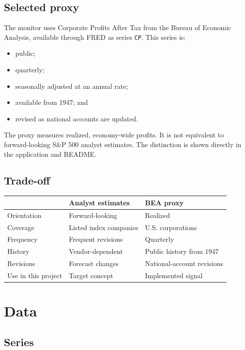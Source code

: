 \documentclass[11pt]{article}
\begin{document}
\subsection{Selected proxy}

The monitor uses Corporate Profits After Tax from the Bureau of Economic
Analysis, available through FRED as series \texttt{CP}. This series is:

\begin{itemize}
  \item public;
  \item quarterly;
  \item seasonally adjusted at an annual rate;
  \item available from 1947; and
  \item revised as national accounts are updated.
\end{itemize}

The proxy measures realized, economy-wide profits. It is not equivalent to
forward-looking S\&P 500 analyst estimates. The distinction is shown directly
in the application and README.

\subsection{Trade-off}

\begin{longtable}{p{}p{}p{}}
\toprule
& \textbf{Analyst estimates} & \textbf{BEA proxy} \\
\midrule
\endhead
Orientation & Forward-looking & Realized \\
Coverage & Listed index companies & U.S. corporations \\
Frequency & Frequent revisions & Quarterly \\
History & Vendor-dependent & Public history from 1947 \\
Revisions & Forecast changes & National-account revisions \\
Use in this project & Target concept & Implemented signal \\
\bottomrule
\end{longtable}

\section{Data}

\subsection{Series}
\end{document}
